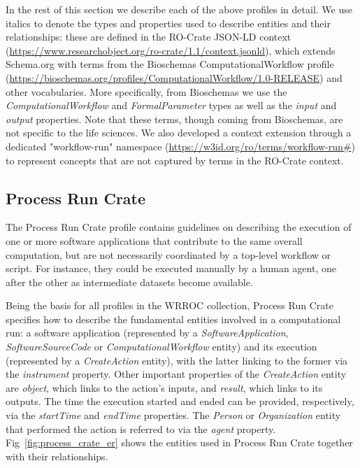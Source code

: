 \documentclass[10pt,letterpaper]{article}
\begin{document}
In the rest of this section we describe each of the above profiles in detail.
We use italics to denote the types and properties used to describe entities and their relationships: these are defined in the RO-Crate JSON-LD context (\url{https://www.researchobject.org/ro-crate/1.1/context.jsonld}), which extends Schema.org with terms from the Bioschemas \cite{Gray 2017} ComputationalWorkflow profile (\url{https://bioschemas.org/profiles/ComputationalWorkflow/1.0-RELEASE}) and other vocabularies. More specifically, from Bioschemas we use the \emph{ComputationalWorkflow} and \emph{FormalParameter} types as well as the \emph{input} and \emph{output} properties. 
Note that these terms, though coming from Bioschemas, are not specific to the life sciences.
We also developed a context extension through a dedicated "workflow-run" namespace (\url{https://w3id.org/ro/terms/workflow-run\#}) to represent concepts that are not captured by terms in the RO-Crate context.

\subsection{Process Run Crate}\label{process-run-crate}

The Process Run Crate profile contains guidelines on describing the execution of one or more software applications that contribute to the same overall computation, but are not necessarily coordinated by a top-level workflow or script.
For instance, they could be executed manually by a human agent, one after the other as intermediate datasets become available.

Being the basis for all profiles in the WRROC collection, Process Run Crate specifies how to describe the fundamental entities involved in a computational run: a software application (represented by a
\emph{SoftwareApplication}, \emph{SoftwareSourceCode} or
\emph{ComputationalWorkflow} entity) and its execution (represented by a \emph{CreateAction} entity), with the latter linking to the former via the \emph{instrument} property.
Other important properties of the
\emph{CreateAction} entity are \emph{object}, which links to the action's inputs, and \emph{result}, which links to its outputs.
The time the execution started and ended can be provided, respectively, via the
\emph{startTime} and \emph{endTime} properties.
The \emph{Person} or
\emph{Organization} entity that performed the action is referred to via the \emph{agent} property.
Fig~\ref{fig:process_crate_er} shows the entities used in Process Run Crate together with their relationships.
\end{document}
